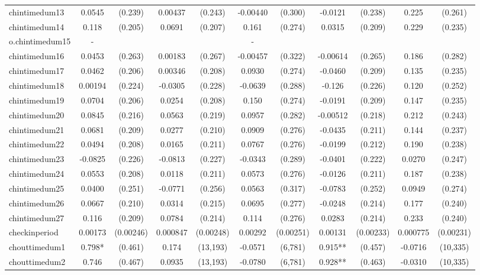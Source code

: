 \documentclass[]{article}
\begin{document}
\begin{tabular}{lcccccccccc}
chintimedum13 & 0.0545 & (0.239) & 0.00437 & (0.243) & -0.00440 & (0.300) & -0.0121 & (0.238) & 0.225 & (0.261) \\
chintimedum14 & 0.118 & (0.205) & 0.0691 & (0.207) & 0.161 & (0.274) & 0.0315 & (0.209) & 0.229 & (0.235) \\
o.chintimedum15 & - &  &  &  & - &  &  &  &  &  \\
chintimedum16 & 0.0453 & (0.263) & 0.00183 & (0.267) & -0.00457 & (0.322) & -0.00614 & (0.265) & 0.186 & (0.282) \\
chintimedum17 & 0.0462 & (0.206) & 0.00346 & (0.208) & 0.0930 & (0.274) & -0.0460 & (0.209) & 0.135 & (0.235) \\
chintimedum18 & 0.00194 & (0.224) & -0.0305 & (0.228) & -0.0639 & (0.288) & -0.126 & (0.226) & 0.120 & (0.252) \\
chintimedum19 & 0.0704 & (0.206) & 0.0254 & (0.208) & 0.150 & (0.274) & -0.0191 & (0.209) & 0.147 & (0.235) \\
chintimedum20 & 0.0845 & (0.216) & 0.0563 & (0.219) & 0.0957 & (0.282) & -0.00512 & (0.218) & 0.212 & (0.243) \\
chintimedum21 & 0.0681 & (0.209) & 0.0277 & (0.210) & 0.0909 & (0.276) & -0.0435 & (0.211) & 0.144 & (0.237) \\
chintimedum22 & 0.0494 & (0.208) & 0.0165 & (0.211) & 0.0767 & (0.276) & -0.0199 & (0.212) & 0.190 & (0.238) \\
chintimedum23 & -0.0825 & (0.226) & -0.0813 & (0.227) & -0.0343 & (0.289) & -0.0401 & (0.222) & 0.0270 & (0.247) \\
chintimedum24 & 0.0553 & (0.208) & 0.0118 & (0.211) & 0.0573 & (0.276) & -0.0126 & (0.211) & 0.187 & (0.238) \\
chintimedum25 & 0.0400 & (0.251) & -0.0771 & (0.256) & 0.0563 & (0.317) & -0.0783 & (0.252) & 0.0949 & (0.274) \\
chintimedum26 & 0.0667 & (0.210) & 0.0314 & (0.215) & 0.0695 & (0.277) & -0.0248 & (0.214) & 0.177 & (0.240) \\
chintimedum27 & 0.116 & (0.209) & 0.0784 & (0.214) & 0.114 & (0.276) & 0.0283 & (0.214) & 0.233 & (0.240) \\
checkinperiod & 0.00173 & (0.00246) & 0.000847 & (0.00248) & 0.00292 & (0.00251) & 0.00131 & (0.00233) & 0.000775 & (0.00231) \\
chouttimedum1 & 0.798* & (0.461) & 0.174 & (13,193) & -0.0571 & (6,781) & 0.915** & (0.457) & -0.0716 & (10,335) \\
chouttimedum2 & 0.746 & (0.467) & 0.0935 & (13,193) & -0.0780 & (6,781) & 0.928** & (0.463) & -0.0310 & (10,335) \\

\end{tabular}
\end{document}
